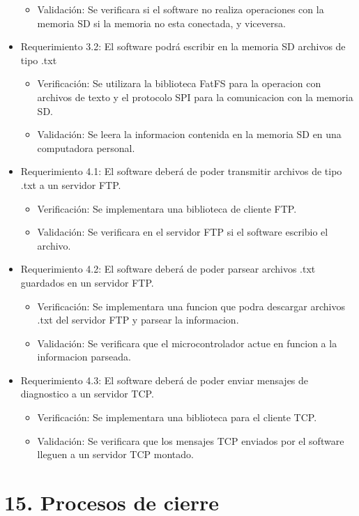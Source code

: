 \documentclass[
11pt, %
]{charter}
\begin{document}
\begin{itemize}
\begin{itemize}
		\item Validación: Se verificara si el software no realiza operaciones con la memoria SD si la memoria no esta conectada, y viceversa.
	\end{itemize}	
\item Requerimiento 3.2: El software podrá escribir en la memoria SD archivos de tipo .txt
	\begin{itemize}
		\item Verificación: Se utilizara la biblioteca FatFS para la operacion con archivos de texto y el protocolo SPI para la comunicacion con la memoria SD. 
		\item Validación: Se leera la informacion contenida en la memoria SD en una computadora personal.
	\end{itemize}
\item Requerimiento 4.1: El software deberá de poder transmitir archivos de tipo .txt a un servidor FTP.
	\begin{itemize}
		\item Verificación: Se implementara una biblioteca de cliente FTP.
		\item Validación: Se verificara en el servidor FTP si el software escribio el archivo.
	\end{itemize}
\item Requerimiento 4.2: El software deberá de poder parsear archivos .txt guardados en un servidor FTP.
	\begin{itemize}
		\item Verificación: Se implementara una funcion que podra descargar  archivos .txt del servidor FTP y parsear la informacion.
		\item Validación: Se verificara que el microcontrolador actue en funcion a la informacion parseada.
	\end{itemize}	
\item Requerimiento 4.3: El software deberá de poder enviar mensajes de diagnostico a un servidor TCP.
	\begin{itemize}
		\item Verificación: Se implementara una biblioteca para el cliente TCP.
		\item Validación: Se verificara que los mensajes TCP enviados por el software lleguen a un servidor TCP montado.
	\end{itemize}			
\end{itemize}

\section{15. Procesos de cierre}    
\label{sec:cierre}
\end{document}
